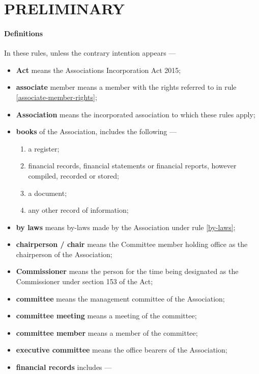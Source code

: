 \documentclass[../constitution.tex]{subfiles}
\begin{document}
\part{PRELIMINARY} \label{part-1---preliminary}

\subsection{Definitions} \label{definitions}

In these rules, unless the contrary intention appears ---

\begin{itemize}[label={-}]
\item \textbf{Act} means the Associations Incorporation Act 2015;
\item \textbf{associate} member means a member with the rights referred to in rule \ref{associate-member-rights};
\item \textbf{Association} means the incorporated association to which these rules apply;
\item \textbf{books} of the Association, includes the following ---

  \begin{enumerate}
  \def\labelenumi{\arabic{enumi}.}
  
  \item a register;
  \item financial records, financial statements or financial reports, however compiled, recorded or stored;
  \item a document;
  \item any other record of information;
  \end{enumerate}
\item \textbf{by laws} means by-laws made by the Association under rule \ref{by-laws};
\item \textbf{chairperson / chair} means the Committee member holding office as the chairperson of the Association;
\item \textbf{Commissioner} means the person for the time being designated as the Commissioner under section 153 of the Act;
\item \textbf{committee} means the management committee of the Association;
\item \textbf{committee meeting} means a meeting of the committee;
\item \textbf{committee member} means a member of the committee;
\item \textbf{executive committee} means the office bearers of the Association;
\item \textbf{financial records} includes ---


\end{itemize}
\end{document}
